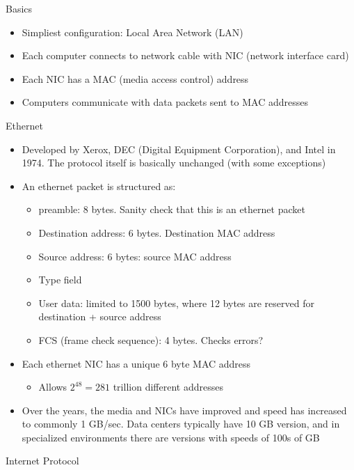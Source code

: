 Basics
\begin{itemize}
    \item Simpliest configuration: Local Area Network (LAN)
    \item Each computer connects to network cable with NIC (network interface card)
    \item Each NIC has a MAC (media access control) address
    \item Computers communicate with data packets sent to MAC addresses
\end{itemize}
Ethernet
\begin{itemize}
    \item Developed by Xerox, DEC (Digital Equipment Corporation), and Intel in 1974. The protocol itself is basically unchanged (with some exceptions)
    \item An ethernet packet is structured as:
    \begin{itemize}
        \item preamble: 8 bytes. Sanity check that this is an ethernet packet
        \item Destination address: 6 bytes. Destination MAC address
        \item Source address: 6 bytes: source MAC address
        \item Type field
        \item User data: limited to 1500 bytes, where 12 bytes are reserved for destination + source address
        \item FCS (frame check sequence): 4 bytes. Checks errors?
    \end{itemize}
    \item Each ethernet NIC has a unique 6 byte MAC address
    \begin{itemize}
        \item Allows $2^48 = 281$ trillion different addresses
    \end{itemize}
    \item Over the years, the media and NICs have improved and speed has increased to commonly 1 GB/sec. Data centers typically have 10 GB version, and in specialized environments there are versions with speeds of 100s of GB
\end{itemize}
Internet Protocol
